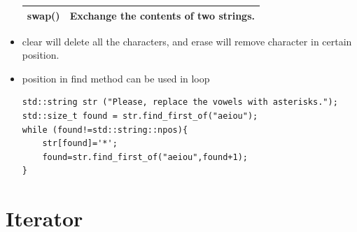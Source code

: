 \documentclass[a4paper,11pt,twoside]{book}
\newcommand{\tophline}{\hline }
\newcommand{\bottomhline}{\\ \hline }
\newcommand{\tophline}{ }
\newcommand{\bottomhline}{ }
\begin{document}
\begin{itemize}
\begin{tabular}{| p{} |p{}|}
		\tophline
		swap() & Exchange the contents of two strings. \bottomhline
	\end{tabular}
	
	\item clear will delete all the characters, and erase will remove character in certain position.
	
	\item position in find method can be used in loop
\begin{lstlisting}[numbers=none]
std::string str ("Please, replace the vowels with asterisks.");
std::size_t found = str.find_first_of("aeiou");
while (found!=std::string::npos){
	str[found]='*';
	found=str.find_first_of("aeiou",found+1);
}
\end{lstlisting}
	
	
\end{itemize}


\section{Iterator}
\end{document}
